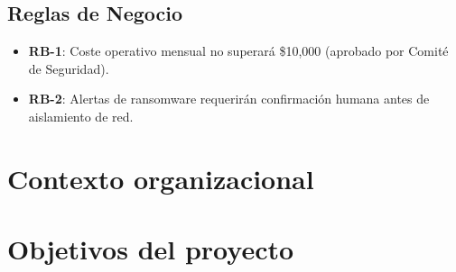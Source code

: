 \subsection{Reglas de Negocio}   \label{sec.reglas-neogcio}
\begin{itemize}  
    \item \textbf{RB-1}: Coste operativo mensual no superará \$10,000 (aprobado por Comité de Seguridad).  
    \item \textbf{RB-2}: Alertas de ransomware requerirán confirmación humana antes de aislamiento de red.  
\end{itemize}  
\section{Contexto organizacional} \label{sec.contexto-organizacional}


\section{Objetivos del proyecto}